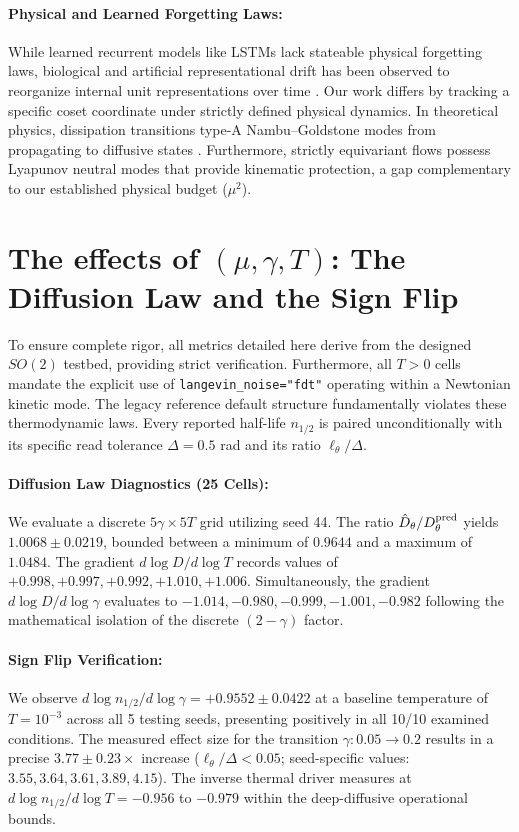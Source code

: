 \documentclass{article}
\begin{document}
\paragraph{Physical and Learned Forgetting Laws:}
While learned recurrent models like LSTMs \citep{hochreiter_long_1997} lack stateable physical forgetting laws, biological and artificial representational drift has been observed to reorganize internal unit representations over time \citep{aitken_geometry_2022}. Our work differs by tracking a specific coset coordinate under strictly defined physical dynamics. In theoretical physics, dissipation transitions type-A Nambu--Goldstone modes from propagating to diffusive states \citep{minami_spontaneous_2018}. Furthermore, strictly equivariant flows possess Lyapunov neutral modes \citep{mo_symmetry-protected_2026} that provide kinematic protection, a gap complementary to our established physical budget ($\mu^2$).

\section{The effects of $(\mu,\gamma,T)$: The Diffusion Law and the Sign Flip}\label{app:budget}

To ensure complete rigor, all metrics detailed here derive from the designed $SO(2)$ testbed, providing strict verification. Furthermore, all $T>0$ cells mandate the explicit use of \texttt{langevin\_noise="fdt"} operating within a Newtonian kinetic mode. The legacy reference default structure fundamentally violates these thermodynamic laws. Every reported half-life $n_{1/2}$ is paired unconditionally with its specific read tolerance $\Delta=0.5$ rad and its ratio $\ell_\theta/\Delta$.

\paragraph{Diffusion Law Diagnostics (25 Cells):} We evaluate a discrete $5\gamma\times5T$ grid utilizing seed 44. The ratio $\hat D_\theta/D_\theta^{\rm pred}$ yields $1.0068\pm0.0219$, bounded between a minimum of $0.9644$ and a maximum of $1.0484$. The gradient $d\log D/d\log T$ records values of $+0.998,+0.997,+0.992,+1.010,+1.006$. Simultaneously, the gradient $d\log D/d\log\gamma$ evaluates to $-1.014,-0.980,-0.999,-1.001,-0.982$ following the mathematical isolation of the discrete $(2-\gamma)$ factor.

\paragraph{Sign Flip Verification:} We observe $d\log n_{1/2}/d\log\gamma=+0.9552\pm0.0422$ at a baseline temperature of $T=10^{-3}$ across all 5 testing seeds, presenting positively in all 10/10 examined conditions. The measured effect size for the transition $\gamma:0.05\to0.2$ results in a precise $3.77\pm0.23\times$ increase ($\ell_\theta/\Delta<0.05$; seed-specific values: $3.55,3.64,3.61,3.89,4.15$). The inverse thermal driver measures at $d\log n_{1/2}/d\log T=-0.956$ to $-0.979$ within the deep-diffusive operational bounds.
\end{document}
